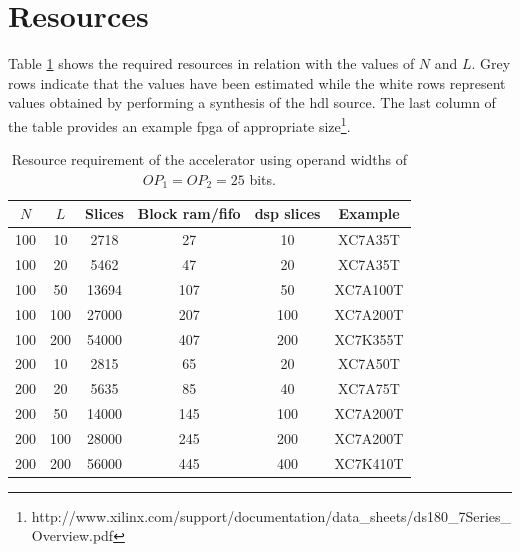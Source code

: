 \documentclass[mscthesis]{usiinfthesis}
\begin{document}
\section{Resources}
\label{ch:conc_ach}

Table \ref{tab:res_res} shows the required resources in relation with the
values of $N$ and $L$. Grey rows indicate that the values have been estimated
while the white rows represent values obtained by performing a synthesis of the
\gls{hdl} source. The last column of the table provides an example \gls{fpga}
of appropriate
size\footnote{http://www.xilinx.com/support/documentation/data\_sheets/ds180\_7Series\_Overview.pdf}.

\begin{table}
    \footnotesize
    \begin{center}
    \begin{tabular}{|c|c|c|c|c|c|}
        \hline
        $N$ & $L$ & Slices & Block \acrshort{ram}/\acrshort{fifo}
        & \acrshort{dsp} slices & Example \\
        \hline
        \hline
        100 & 10 & 2718  & 27  & 10 & XC7A35T \\
        100 & 20 & 5462  & 47  & 20 & XC7A35T \\
        100 & 50 & 13694 & 107 & 50 & XC7A100T\\
        \rowcolor{black!20}
        100 & 100 & 27000 & 207 & 100 & XC7A200T\\
        \rowcolor{black!20}
        100 & 200 & 54000 & 407 & 200 & XC7K355T\\
        200 & 10 & 2815  & 65  & 20 & XC7A50T \\
        200 & 20 & 5635  & 85  & 40 & XC7A75T \\
        \rowcolor{black!20}
        200 & 50 & 14000  & 145 & 100 & XC7A200T \\
        \rowcolor{black!20}
        200 & 100 & 28000 & 245 & 200 & XC7A200T \\
        \rowcolor{black!20}
        200 & 200 & 56000 & 445 & 400 & XC7K410T \\
        \hline
    \end{tabular}
    \end{center}
    \caption{Resource requirement of the accelerator using operand widths of
        $OP_1 = OP_2 = 25$ bits.}
    \label{tab:res_res}
\end{table}
\end{document}
